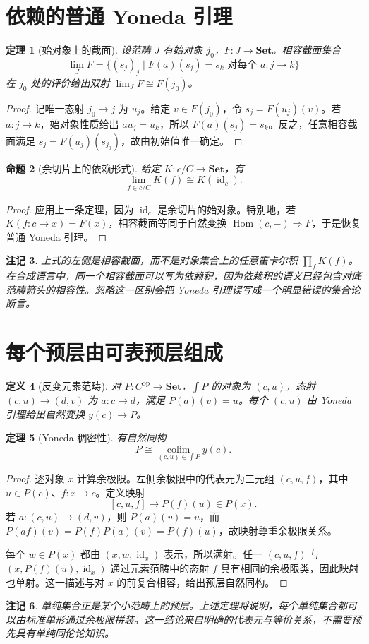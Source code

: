 \documentclass[12pt,oneside,openany,fontset=none]{ctexbook}
\theoremstyle{cn}
\newtheorem{definition}{定义}[chapter]
\newtheorem{proposition}[definition]{命题}
\newtheorem{theorem}[definition]{定理}
\newtheorem{remark}[definition]{注记}
\numberwithin{equation}{chapter}
\newcommand{\Set}{\mathbf{Set}}
\newcommand{\id}{\operatorname{id}}
\newcommand{\Hom}{\operatorname{Hom}}
\newcommand{\op}{\mathrm{op}}
\newcommand{\colim}{\operatorname*{colim}}
\newcommand{\limm}{\operatorname*{lim}}
\begin{document}
\section{依赖的普通 Yoneda 引理}
\begin{theorem}[始对象上的截面]
设范畴 $J$ 有始对象 $j_0$，$F:J\to\Set$。相容截面集合
\[
\limm_J F=\{(s_j)_j\mid F(a)(s_j)=s_k\text{ 对每个 }a:j\to k\}
\]
在 $j_0$ 处的评价给出双射 $\limm_JF\cong F(j_0)$。
\end{theorem}
\begin{proof}
记唯一态射 $j_0\to j$ 为 $u_j$。给定 $v\in F(j_0)$，令 $s_j=F(u_j)(v)$。若 $a:j\to k$，始对象性质给出 $au_j=u_k$，所以 $F(a)(s_j)=s_k$。反之，任意相容截面满足 $s_j=F(u_j)(s_{j_0})$，故由初始值唯一确定。
\end{proof}
\begin{proposition}[余切片上的依赖形式]
给定 $K:c/C\to\Set$，有
\[
\limm_{f\in c/C}K(f)\cong K(\id_c).
\]
\end{proposition}
\begin{proof}
应用上一条定理，因为 $\id_c$ 是余切片的始对象。特别地，若 $K(f:c\to x)=F(x)$，相容截面等同于自然变换 $\Hom(c,-)\Rightarrow F$，于是恢复普通 Yoneda 引理。
\end{proof}
\begin{remark}
上式的左侧是相容截面，而不是对象集合上的任意笛卡尔积 $\prod_fK(f)$。在合成语言中，同一个相容截面可以写为依赖积，因为依赖积的语义已经包含对底范畴箭头的相容性。忽略这一区别会把 Yoneda 引理误写成一个明显错误的集合论断言。
\end{remark}

\section{每个预层由可表预层组成}
\begin{definition}[反变元素范畴]
对 $P:C^\op\to\Set$，$\int P$ 的对象为 $(c,u)$，态射 $(c,u)\to(d,v)$ 为 $a:c\to d$，满足 $P(a)(v)=u$。每个 $(c,u)$ 由 Yoneda 引理给出自然变换 $y(c)\to P$。
\end{definition}
\begin{theorem}[Yoneda 稠密性]\label{thm:density}
有自然同构
\[
P\cong\colim_{(c,u)\in\int P}y(c).
\]
\end{theorem}
\begin{proof}
逐对象 $x$ 计算余极限。左侧余极限中的代表元为三元组 $(c,u,f)$，其中 $u\in P(c)$、$f:x\to c$。定义映射
\[
[c,u,f]\longmapsto P(f)(u)\in P(x).
\]
若 $a:(c,u)\to(d,v)$，则 $P(a)(v)=u$，而
$P(af)(v)=P(f)P(a)(v)=P(f)(u)$，故映射尊重余极限关系。

每个 $w\in P(x)$ 都由 $(x,w,\id_x)$ 表示，所以满射。任一 $(c,u,f)$ 与 $(x,P(f)(u),\id_x)$ 通过元素范畴中的态射 $f$ 具有相同的余极限类，因此映射也单射。这一描述与对 $x$ 的前复合相容，给出预层自然同构。
\end{proof}
\begin{remark}
单纯集合正是某个小范畴上的预层。上述定理将说明，每个单纯集合都可以由标准单形通过余极限拼装。这一结论来自明确的代表元与等价关系，不需要预先具有单纯同伦论知识。
\end{remark}
\end{document}
